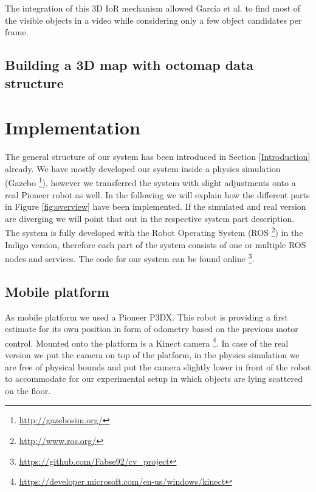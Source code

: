 \documentclass[a4paper,11pt,english]{article}
\begin{document}
The integration of this 3D IoR mechanism allowed García et al. to find most of the visible objects in a video while considering only a few object candidates per frame.

\subsection{Building a 3D map with octomap data structure}
\label{Theoretical_background:Building_a_3Dmap_with_octomap_data_structure}

\section{Implementation}
\label{Implementation}

The general structure of our system has been introduced in Section \ref{Introduction} already.
We have mostly developed our system inside a physics simulation (Gazebo \footnote{\url{http://gazebosim.org/}}), however we transferred the system with slight adjustments onto a real Pioneer robot as well.
In the following we will explain how the different parts in Figure \ref{fig:overview} have been implemented. If the simulated and real version are diverging we will point that out in the respective system part description.
The system is fully developed with the Robot Operating System (ROS \footnote{\url{http://www.ros.org/}}) in the Indigo version, therefore each part of the system consists of one or multiple ROS nodes and services.
The code for our system can be found online \footnote{\url{https://github.com/Fabse92/cv_project}}.

\subsection{Mobile platform}
As mobile platform we used a Pioneer P3DX. This robot is providing a first estimate for its own position in form of odometry based on the previous motor control. Mounted onto the platform is a Kinect camera \footnote{\url{https://developer.microsoft.com/en-us/windows/kinect}}. In case of the real version we put the camera on top of the platform, in the physics simulation we are free of physical bounds and put the camera slightly lower in front of the robot to accommodate for our experimental setup in which objects are lying scattered on the floor.
\end{document}
